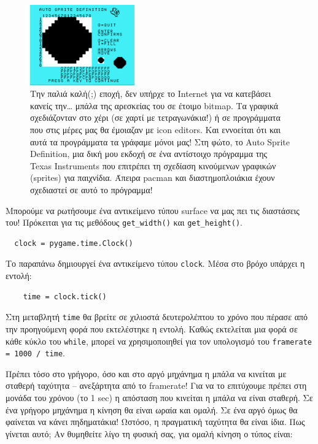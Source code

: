 \begin{figure}
  \centering
  \includegraphics[width=0.4\textwidth]{images/chapter4/spritedefiner}
  \caption[Sprite definer]{Την παλιά καλή(;) εποχή, δεν υπήρχε το Internet
για να κατεβάσει κανείς την\ldots{} μπάλα της αρεσκείας του σε έτοιμο bitmap. Τα γραφικά σχεδιάζονταν στο χέρι (σε χαρτί με τετραγωνάκια!) ή σε προγράμματα που στις μέρες μας θα έμοιαζαν με icon editors. Και εννοείται ότι και αυτά τα προγράμματα τα γράφαμε μόνοι μας! Στη φώτο, το Auto Sprite Definition, μια δική μου εκδοχή σε ένα αντίστοιχο πρόγραμμα της Texas Instruments που επιτρέπει τη σχεδίαση κινούμενων γραφικών (sprites) για παιχνίδια.  Άπειρα pacman και διαστημοπλοιάκια έχουν σχεδιαστεί σε αυτό το πρόγραμμα!}
  \label{4-3}
\end{figure}

Μπορούμε να ρωτήσουμε ένα αντικείμενο τύπου surface να μας πει τις
διαστάσεις του! Πρόκειται για τις μεθόδους {\tt get\_width()} και {\tt get\_height()}.

\begin{verbatim}
  clock = pygame.time.Clock()
\end{verbatim}

Το παραπάνω δημιουργεί ένα αντικείμενο τύπου {\tt clock}. Μέσα στο βρόχο υπάρχει η εντολή:

\begin{verbatim}
    time = clock.tick()
\end{verbatim}

Στη μεταβλητή {\tt time} θα βρείτε σε χιλιοστά δευτερολέπτου το χρόνο που πέρασε από την προηγούμενη φορά που εκτελέστηκε η εντολή. Καθώς εκτελείται μια φορά σε κάθε κύκλο του {\tt while}, μπορεί να χρησιμοποιηθεί για τον υπολογισμό του {\tt framerate = 1000 / time}.

Πρέπει τόσο στο γρήγορο, όσο και στο αργό μηχάνημα η μπάλα να κινείται με σταθερή ταχύτητα -- ανεξάρτητα από το framerate! Για να το επιτύχουμε πρέπει στη μονάδα του χρόνου (το 1 sec) η απόσταση που κινείται η μπάλα να είναι σταθερή. Σε ένα γρήγορο μηχάνημα η κίνηση θα είναι ωραία και ομαλή. Σε ένα αργό όμως θα φαίνεται να κάνει πηδηματάκια! Ωστόσο, η πραγματική ταχύτητα θα είναι ίδια. Πως γίνεται αυτό; Αν θυμηθείτε λίγο τη φυσική σας, για ομαλή κίνηση ο τύπος είναι:

